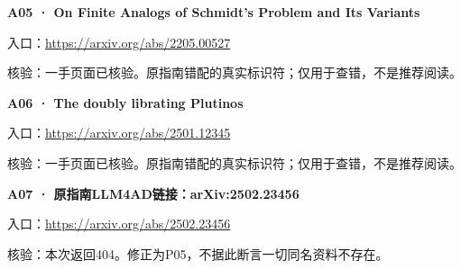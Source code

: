 \par\noindent\begin{minipage}{\linewidth}
\textbf{A05 · On Finite Analogs of Schmidt's Problem and Its Variants}

入口：\url{https://arxiv.org/abs/2205.00527}

核验：一手页面已核验。原指南错配的真实标识符；仅用于查错，不是推荐阅读。
\end{minipage}\par\vspace{6pt}

\par\noindent\begin{minipage}{\linewidth}
\textbf{A06 · The doubly librating Plutinos}

入口：\url{https://arxiv.org/abs/2501.12345}

核验：一手页面已核验。原指南错配的真实标识符；仅用于查错，不是推荐阅读。
\end{minipage}\par\vspace{6pt}

\par\noindent\begin{minipage}{\linewidth}
\textbf{A07 · 原指南LLM4AD链接：arXiv:\allowbreak{}2502.23456}

入口：\url{https://arxiv.org/abs/2502.23456}

核验：本次返回404。修正为P05，不据此断言一切同名资料不存在。
\end{minipage}\par\vspace{6pt}

